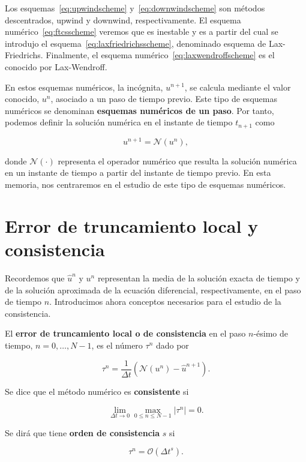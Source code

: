 Los esquemas~\eqref{eq:upwindscheme} y~\eqref{eq:downwindscheme} son
métodos descentrados, upwind y downwind, respectivamente.
El esquema numérico~\eqref{eq:ftcsscheme} veremos que es inestable y
es a partir del cual se introdujo el
esquema~\eqref{eq:laxfriedrichsscheme}, denominado esquema de
Lax-Friedrichs.
Finalmente, el esquema numérico~\eqref{eq:laxwendroffscheme} es el
conocido por Lax-Wendroff.

En estos esquemas numéricos, la incógnita, $u^{n+1}$, se calcula
mediante el valor conocido, $u^{n}$, asociado a un paso de tiempo
previo.
Este tipo de esquemas numéricos se denominan
\textbf{esquemas numéricos de un paso}.
Por tanto, podemos definir la solución numérica en el instante de
tiempo $t_{n+1}$ como

\begin{equation*}
  u^{n+1}=
  \mathcal{N}
  \left(u^{n}\right),
\end{equation*}

donde $\mathcal{N}\left(\cdot\right)$ representa el operador numérico
que resulta la solución numérica en un instante de tiempo a partir
del instante de tiempo previo.
En esta memoria, nos centraremos en el estudio de este tipo de
esquemas numéricos.

\section{Error de truncamiento local y consistencia}

Recordemos que $\widehat{u}^{n}$ y $u^{n}$ representan la media de la
solución exacta de tiempo y de la solución aproximada de la ecuación
diferencial, respectivamente, en el paso de tiempo $n$.
Introducimos ahora conceptos necesarios para el estudio de la
consistencia.

\begin{definition}
  El \textbf{error de truncamiento local o de consistencia} en el
  paso $n$-ésimo de tiempo, $n=0,\dotsc,N-1$, es el número $\tau^{n}$
  dado por

  \begin{equation*}
    \tau^{n}=
    \frac{1}{\Delta t}
    \left(
    \mathcal{N}\left(u^{n}\right)-
    \widehat{u}^{n+1}
    \right).
  \end{equation*}
\end{definition}

\begin{definition}
  Se dice que el método numérico es \textbf{consistente} si

  \begin{equation*}
    \lim_{\Delta t\to0}
    \max_{0\leq n\leq N-1}
    \left|\tau^{n}\right|
    =0.
  \end{equation*}

  Se dirá que tiene \textbf{orden de consistencia} $s$ si

  \begin{equation*}
    \tau^{n}=
    \mathcal{O}
    \left({\Delta t}^{s}\right).
  \end{equation*}
\end{definition}

